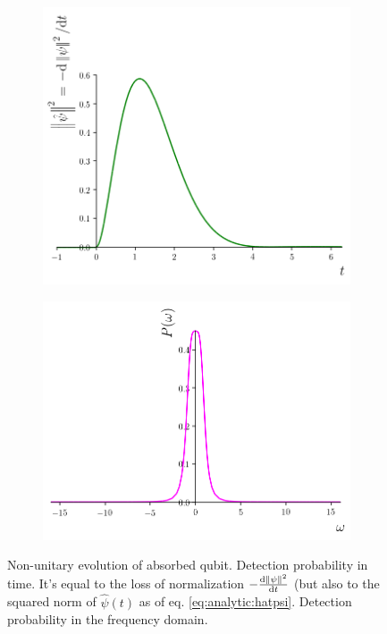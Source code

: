 \begin{figure}
  \centering
  \begin{subfigure}[b]{0.49\textwidth}
    \includegraphics[width=\linewidth]{img/2ldetect/qubit_normalization_loss.png}
    \subcaption{}\label{fig:absorbed-qubit-normalization-loss:t}
  \end{subfigure}
  \begin{subfigure}[b]{0.49\textwidth}
    \includegraphics[width=\linewidth]{img/2ldetect/P_omega.png}
    \subcaption{}\label{fig:absorbed-qubit-normalization-loss:omega}
  \end{subfigure}
  \caption[
    Non-unitary evolution of absorbed qubit (cont.)
  ]{
    Non-unitary evolution of absorbed qubit.
      Detection probability in time. It's equal to the
      loss of normalization $-\dv{\norm{\psi}^2}{t}$
      (but also to the squared norm of $\hat{\psi}(t)$ as of eq. \eqref{eq:analytic:hatpsi}.
      Detection probability in the frequency domain.
  }
  \label{fig:absorbed-qubit-normalization-loss}
\end{figure}


